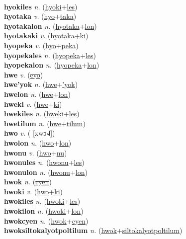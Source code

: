  \label{hyoki} \\
\textbf{hyokiles} \textit{n.} (\hyperref[hyoki]{hyoki}+\hyperref[les]{les})
 \label{hyokiles} \\
\textbf{hyotaka} \textit{v.} (\hyperref[hyo]{hyo}+\hyperref[taka]{taka})
 \label{hyotaka} \\
\textbf{hyotakalon} \textit{n.} (\hyperref[hyotaka]{hyotaka}+\hyperref[lon]{lon})
 \label{hyotakalon} \\
\textbf{hyotakaki} \textit{v.} (\hyperref[hyotaka]{hyotaka}+\hyperref[ki]{ki})
 \label{hyotakaki} \\
\textbf{hyopeka} \textit{v.} (\hyperref[hyo]{hyo}+\hyperref[peka]{peka})
 \label{hyopeka} \\
\textbf{hyopekales} \textit{n.} (\hyperref[hyopeka]{hyopeka}+\hyperref[les]{les})
 \label{hyopekales} \\
\textbf{hyopekalon} \textit{n.} (\hyperref[hyopeka]{hyopeka}+\hyperref[lon]{lon})
 \label{hyopekalon} \\
\textbf{hwe} \textit{v.} (\hyperref[cyo]{\sout{cyo}})
 \label{hwe} \\
\textbf{hwe'yok} \textit{n.} (\hyperref[hwe]{hwe}+\hyperref['yok]{'yok})
 \label{hwe'yok} \\
\textbf{hwelon} \textit{n.} (\hyperref[hwe]{hwe}+\hyperref[lon]{lon})
 \label{hwelon} \\
\textbf{hweki} \textit{v.} (\hyperref[hwe]{hwe}+\hyperref[ki]{ki})
 \label{hweki} \\
\textbf{hwekiles} \textit{n.} (\hyperref[hweki]{hweki}+\hyperref[les]{les})
 \label{hwekiles} \\
\textbf{hwetilum} \textit{n.} (\hyperref[hwe]{hwe}+\hyperref[tilum]{tilum})
 \label{hwetilum} \\
\textbf{hwo} \textit{v.} ( [xwɔ˧˩˧])
 \label{hwo} \\
\textbf{hwolon} \textit{n.} (\hyperref[hwo]{hwo}+\hyperref[lon]{lon})
 \label{hwolon} \\
\textbf{hwonu} \textit{v.} (\hyperref[hwo]{hwo}+\hyperref[nu]{nu})
 \label{hwonu} \\
\textbf{hwonules} \textit{n.} (\hyperref[hwonu]{hwonu}+\hyperref[les]{les})
 \label{hwonules} \\
\textbf{hwonulon} \textit{n.} (\hyperref[hwonu]{hwonu}+\hyperref[lon]{lon})
 \label{hwonulon} \\
\textbf{hwok} \textit{n.} (\hyperref[cyen]{\sout{cyen}})
 \label{hwok} \\
\textbf{hwoki} \textit{v.} (\hyperref[hwo]{hwo}+\hyperref[ki]{ki})
 \label{hwoki} \\
\textbf{hwokiles} \textit{n.} (\hyperref[hwoki]{hwoki}+\hyperref[les]{les})
 \label{hwokiles} \\
\textbf{hwokilon} \textit{n.} (\hyperref[hwoki]{hwoki}+\hyperref[lon]{lon})
 \label{hwokilon} \\
\textbf{hwokcyen} \textit{n.} (\hyperref[hwok]{hwok}+\hyperref[cyen]{cyen})
 \label{hwokcyen} \\
\textbf{hwoksiltokalyotpoltilum} \textit{n.} (\hyperref[hwok]{hwok}+\hyperref[siltokalyotpoltilum]{siltokalyotpoltilum})
 \label{hwoksiltokalyotpoltilum} 

